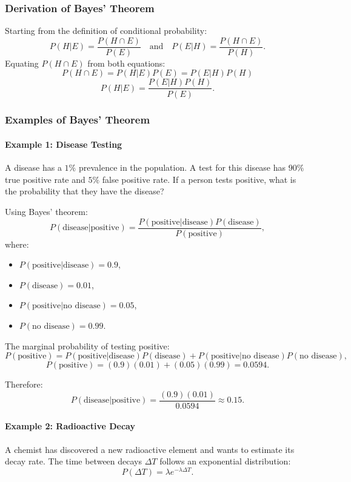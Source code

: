 \documentclass[12pt,a4paper]{article}
\begin{document}
\subsubsection{Derivation of Bayes’ Theorem}
Starting from the definition of conditional probability:
\[
P(H|E) = \frac{P(H \cap E)}{P(E)} \quad \text{and} \quad P(E|H) = \frac{P(H \cap E)}{P(H)}.
\]
Equating \( P(H \cap E) \) from both equations:
\[
P(H\cap E) = P(H|E)P(E) = P(E|H)P(H)
\]
\[
P(H|E) = \frac{P(E|H)P(H)}{P(E)}.
\]

\subsubsection{Examples of Bayes’ Theorem}

\paragraph{Example 1: Disease Testing}
A disease has a \( 1\% \) prevalence in the population. A test for this disease has \( 90\% \) true positive rate and \( 5\% \) false positive rate. If a person tests positive, what is the probability that they have the disease?

Using Bayes' theorem:
\[
P(\text{disease}|\text{positive}) = \frac{P(\text{positive}|\text{disease})P(\text{disease})}{P(\text{positive})},
\]
where:
\begin{itemize}
    \item \( P(\text{positive}|\text{disease}) = 0.9 \),
    \item \( P(\text{disease}) = 0.01 \),
    \item \( P(\text{positive}|\text{no disease}) = 0.05 \),
    \item \( P(\text{no disease}) = 0.99 \).
\end{itemize}

The marginal probability of testing positive:
\[
P(\text{positive}) = P(\text{positive}|\text{disease})P(\text{disease}) + P(\text{positive}|\text{no disease})P(\text{no disease}),
\]
\[
P(\text{positive}) = (0.9)(0.01) + (0.05)(0.99) = 0.0594.
\]

Therefore:
\[
P(\text{disease}|\text{positive}) = \frac{(0.9)(0.01)}{0.0594} \approx 0.15.
\]

\paragraph{Example 2: Radioactive Decay}
A chemist has discovered a new radioactive element and wants to estimate its decay rate. The time between decays \( \Delta T \) follows an exponential distribution:
\[
P(\Delta T) = \lambda e^{-\lambda \Delta T}.
\]
\end{document}
